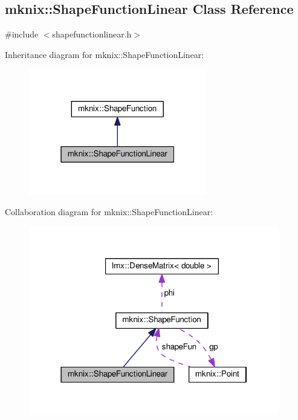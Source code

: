 \hypertarget{classmknix_1_1_shape_function_linear}{}\subsection{mknix\+:\+:Shape\+Function\+Linear Class Reference}
\label{classmknix_1_1_shape_function_linear}


{\ttfamily \#include $<$shapefunctionlinear.\+h$>$}



Inheritance diagram for mknix\+:\+:Shape\+Function\+Linear\+:\nopagebreak
\begin{figure}[H]
\begin{center}
\leavevmode
\includegraphics[width=220pt]{d7/de5/classmknix_1_1_shape_function_linear__inherit__graph}
\end{center}
\end{figure}


Collaboration diagram for mknix\+:\+:Shape\+Function\+Linear\+:\nopagebreak
\begin{figure}[H]
\begin{center}
\leavevmode
\includegraphics[width=310pt]{dd/d38/classmknix_1_1_shape_function_linear__coll__graph}
\end{center}
\end{figure}
